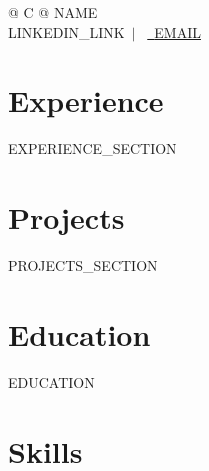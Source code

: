 \documentclass[a4paper,10pt]{article}
\begin{document}
\pagestyle{empty} 


\newcommand{\name}{{{NAME}}}
\newcommand{\emaila}{{{EMAIL}}}
\newcommand{\linkedin}{{{LINKEDIN_LINK}}}

\begin{tabularx}{\linewidth}{@{} C @{}}
\Huge{\name}\\[7.5pt]

\linkedin \ $|$ \
\href{mailto:\emaila}{\raisebox{-0.05\height}\faEnvelope\ \emaila}
\end{tabularx}


\section{Experience}

{{EXPERIENCE_SECTION}}

\section{Projects}

{{PROJECTS_SECTION}}

\section{Education}

{{EDUCATION}}

\section{Skills}
\end{document}
